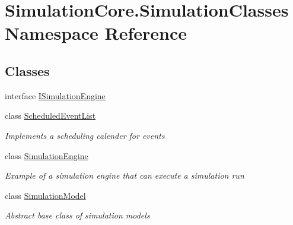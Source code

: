 \hypertarget{namespace_simulation_core_1_1_simulation_classes}{}\section{Simulation\+Core.\+Simulation\+Classes Namespace Reference}
\label{namespace_simulation_core_1_1_simulation_classes}
\subsection*{Classes}
\begin{DoxyCompactItemize}
\item 
interface \hyperlink{interface_simulation_core_1_1_simulation_classes_1_1_i_simulation_engine}{I\+Simulation\+Engine}
\item 
class \hyperlink{class_simulation_core_1_1_simulation_classes_1_1_scheduled_event_list}{Scheduled\+Event\+List}
\begin{DoxyCompactList}\small\item\em Implements a scheduling calender for events \end{DoxyCompactList}\item 
class \hyperlink{class_simulation_core_1_1_simulation_classes_1_1_simulation_engine}{Simulation\+Engine}
\begin{DoxyCompactList}\small\item\em Example of a simulation engine that can execute a simulation run \end{DoxyCompactList}\item 
class \hyperlink{class_simulation_core_1_1_simulation_classes_1_1_simulation_model}{Simulation\+Model}
\begin{DoxyCompactList}\small\item\em Abstract base class of simulation models \end{DoxyCompactList}\end{DoxyCompactItemize}

